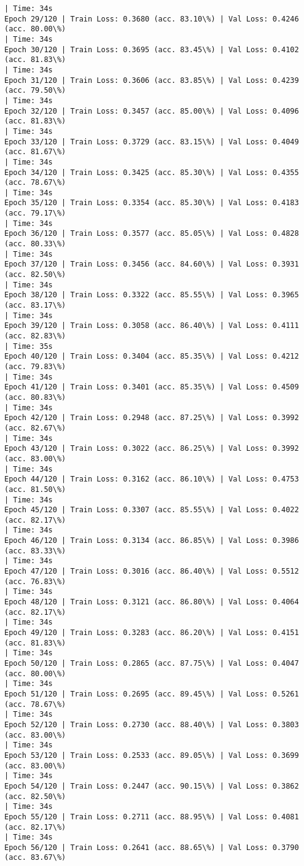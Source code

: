 \documentclass[8pt]{extarticle}
\begin{document}
\begin{Verbatim}[commandchars=\\\{\}]
| Time: 34s
Epoch 29/120 | Train Loss: 0.3680 (acc. 83.10\%) | Val Loss: 0.4246 (acc. 80.00\%)
| Time: 34s
Epoch 30/120 | Train Loss: 0.3695 (acc. 83.45\%) | Val Loss: 0.4102 (acc. 81.83\%)
| Time: 34s
Epoch 31/120 | Train Loss: 0.3606 (acc. 83.85\%) | Val Loss: 0.4239 (acc. 79.50\%)
| Time: 34s
Epoch 32/120 | Train Loss: 0.3457 (acc. 85.00\%) | Val Loss: 0.4096 (acc. 81.83\%)
| Time: 34s
Epoch 33/120 | Train Loss: 0.3729 (acc. 83.15\%) | Val Loss: 0.4049 (acc. 81.67\%)
| Time: 34s
Epoch 34/120 | Train Loss: 0.3425 (acc. 85.30\%) | Val Loss: 0.4355 (acc. 78.67\%)
| Time: 34s
Epoch 35/120 | Train Loss: 0.3354 (acc. 85.30\%) | Val Loss: 0.4183 (acc. 79.17\%)
| Time: 34s
Epoch 36/120 | Train Loss: 0.3577 (acc. 85.05\%) | Val Loss: 0.4828 (acc. 80.33\%)
| Time: 34s
Epoch 37/120 | Train Loss: 0.3456 (acc. 84.60\%) | Val Loss: 0.3931 (acc. 82.50\%)
| Time: 34s
Epoch 38/120 | Train Loss: 0.3322 (acc. 85.55\%) | Val Loss: 0.3965 (acc. 83.17\%)
| Time: 34s
Epoch 39/120 | Train Loss: 0.3058 (acc. 86.40\%) | Val Loss: 0.4111 (acc. 82.83\%)
| Time: 35s
Epoch 40/120 | Train Loss: 0.3404 (acc. 85.35\%) | Val Loss: 0.4212 (acc. 79.83\%)
| Time: 34s
Epoch 41/120 | Train Loss: 0.3401 (acc. 85.35\%) | Val Loss: 0.4509 (acc. 80.83\%)
| Time: 34s
Epoch 42/120 | Train Loss: 0.2948 (acc. 87.25\%) | Val Loss: 0.3992 (acc. 82.67\%)
| Time: 34s
Epoch 43/120 | Train Loss: 0.3022 (acc. 86.25\%) | Val Loss: 0.3992 (acc. 83.00\%)
| Time: 34s
Epoch 44/120 | Train Loss: 0.3162 (acc. 86.10\%) | Val Loss: 0.4753 (acc. 81.50\%)
| Time: 34s
Epoch 45/120 | Train Loss: 0.3307 (acc. 85.55\%) | Val Loss: 0.4022 (acc. 82.17\%)
| Time: 34s
Epoch 46/120 | Train Loss: 0.3134 (acc. 86.85\%) | Val Loss: 0.3986 (acc. 83.33\%)
| Time: 34s
Epoch 47/120 | Train Loss: 0.3016 (acc. 86.40\%) | Val Loss: 0.5512 (acc. 76.83\%)
| Time: 34s
Epoch 48/120 | Train Loss: 0.3121 (acc. 86.80\%) | Val Loss: 0.4064 (acc. 82.17\%)
| Time: 34s
Epoch 49/120 | Train Loss: 0.3283 (acc. 86.20\%) | Val Loss: 0.4151 (acc. 81.83\%)
| Time: 34s
Epoch 50/120 | Train Loss: 0.2865 (acc. 87.75\%) | Val Loss: 0.4047 (acc. 80.00\%)
| Time: 34s
Epoch 51/120 | Train Loss: 0.2695 (acc. 89.45\%) | Val Loss: 0.5261 (acc. 78.67\%)
| Time: 34s
Epoch 52/120 | Train Loss: 0.2730 (acc. 88.40\%) | Val Loss: 0.3803 (acc. 83.00\%)
| Time: 34s
Epoch 53/120 | Train Loss: 0.2533 (acc. 89.05\%) | Val Loss: 0.3699 (acc. 83.00\%)
| Time: 34s
Epoch 54/120 | Train Loss: 0.2447 (acc. 90.15\%) | Val Loss: 0.3862 (acc. 82.50\%)
| Time: 34s
Epoch 55/120 | Train Loss: 0.2711 (acc. 88.95\%) | Val Loss: 0.4081 (acc. 82.17\%)
| Time: 34s
Epoch 56/120 | Train Loss: 0.2641 (acc. 88.65\%) | Val Loss: 0.3790 (acc. 83.67\%)

\end{Verbatim}
\end{document}
